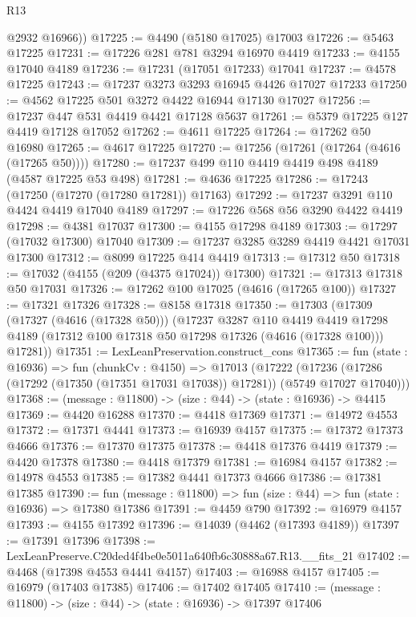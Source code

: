 \begin{lexlean}{R13}
\begin{coremodule}
        @2932
        @16966))
@17225 := @4490 (@5180 @17025) @17003
@17226 := @5463 @17225
@17231 := @17226 @281 @781 @3294 @16970 @4419
@17233 := @4155 @17040 @4189
@17236 := @17231 (@17051 @17233) @17041
@17237 := @4578 @17225
@17243 := @17237 @3273 @3293 @16945 @4426 @17027 @17233
@17250 := @4562 @17225 @501 @3272 @4422 @16944 @17130 @17027
@17256 := @17237 @447 @531 @4419 @4421 @17128 @5637
@17261 := @5379 @17225 @127 @4419 @17128 @17052
@17262 := @4611 @17225
@17264 := @17262 @50 @16980
@17265 := @4617 @17225
@17270 := @17256 (@17261 (@17264 (@4616 (@17265 @50))))
@17280 := @17237 @499 @110 @4419 @4419 @498 @4189 (@4587 @17225 @53 @498)
@17281 := @4636 @17225
@17286 := @17243 (@17250 (@17270 (@17280 @17281)) @17163)
@17292 := @17237 @3291 @110 @4424 @4419 @17040 @4189
@17297 := @17226 @568 @56 @3290 @4422 @4419
@17298 := @4381 @17037
@17300 := @4155 @17298 @4189
@17303 := @17297 (@17032 @17300) @17040
@17309 := @17237 @3285 @3289 @4419 @4421 @17031 @17300
@17312 := @8099 @17225 @414 @4419
@17313 := @17312 @50
@17318 := @17032 (@4155 (@209 (@4375 @17024)) @17300)
@17321 := @17313 @17318 @50 @17031
@17326 := @17262 @100 @17025 (@4616 (@17265 @100))
@17327 := @17321 @17326
@17328 := @8158 @17318
@17350 := @17303
    (@17309
      (@17327 (@4616 (@17328 @50)))
      (@17237
        @3287
        @110
        @4419
        @4419
        @17298
        @4189
        (@17312 @100 @17318 @50 @17298 @17326 (@4616 (@17328 @100)))
        @17281))
@17351 := LexLeanPreservation.construct_cons
@17365 := fun (state : @16936) =>
  fun (chunkCv : @4150) =>
  @17013
    (@17222 (@17236 (@17286 (@17292 (@17350 (@17351 @17031 @17038)) @17281)) (@5749 @17027 @17040)))
@17368 := (message : @11800) -> (size : @44) -> (state : @16936) -> @4415
@17369 := @4420 @16288
@17370 := @4418 @17369
@17371 := @14972 @4553
@17372 := @17371 @4441
@17373 := @16939 @4157
@17375 := @17372 @17373 @4666
@17376 := @17370 @17375
@17378 := @4418 @17376 @4419
@17379 := @4420 @17378
@17380 := @4418 @17379
@17381 := @16984 @4157
@17382 := @14978 @4553
@17385 := @17382 @4441 @17373 @4666
@17386 := @17381 @17385
@17390 := fun (message : @11800) => fun (size : @44) => fun (state : @16936) => @17380 @17386
@17391 := @4459 @790
@17392 := @16979 @4157
@17393 := @4155 @17392
@17396 := @14039 (@4462 (@17393 @4189))
@17397 := @17391 @17396
@17398 := LexLeanPreserve.C20ded4f4be0e5011a640fb6c30888a67.R13.__fits_21
@17402 := @4468 (@17398 @4553 @4441 @4157)
@17403 := @16988 @4157
@17405 := @16979 (@17403 @17385)
@17406 := @17402 @17405
@17410 := (message : @11800) -> (size : @44) -> (state : @16936) -> @17397 @17406

\end{coremodule}
\end{lexlean}
